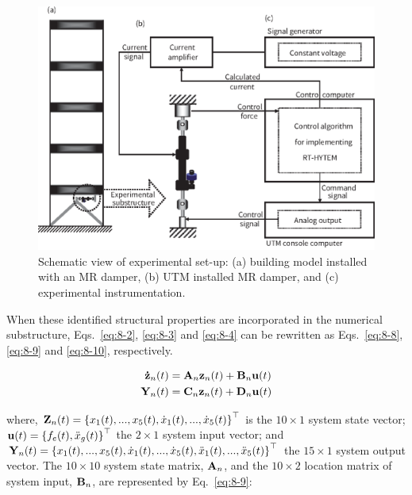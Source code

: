 \begin{figure}[ht]
\centering
\includegraphics[width=1\textwidth] {figure/8-3.eps}
\caption{Schematic view of experimental set-up: (a) building model installed with an MR damper, (b) UTM installed MR damper, and (c) experimental instrumentation.}
\label{fig:8-3}
\end{figure}


When these identified structural properties are incorporated in the numerical substructure, Eqs.~\eqref{eq:8-2}, \eqref{eq:8-3} and \eqref{eq:8-4} can be rewritten as Eqs.~\eqref{eq:8-8}, \eqref{eq:8-9} and \eqref{eq:8-10}, respectively.

\begin{equation}\label{eq:8-8}
\begin{aligned}
\mathbf{\dot{z}}_{n}(t) & = \mathbf{A}_{n}\mathbf{z}_{n}(t) + \mathbf{B}_{n}\mathbf{u}(t) \\
\mathbf{Y}_{n}(t) & = \mathbf{C}_{n}\mathbf{z}_{n}(t) + \mathbf{D}_{n}\mathbf{u}(t)
\end{aligned}
\end{equation}

where, $\mathbf{Z}_{n}(t) = \left\{ x_{1}(t),...,x_{5}(t),\dot{x}_{1}(t),...,\dot{x}_{5}(t)\right\}^{\top}$ is the $10\times1$ system state vector; $\mathbf{u}(t)=\left\{f_{e}(t), \ddot{x}_{g}(t)\right\}^{\top}$ the $2\times1$ system input vector; and $\mathbf{Y}_{n}(t) = \left\{x_{1}(t),...,x_{5}(t),\dot{x}_{1}(t),...,\dot{x}_{5}(t),\ddot{x}_{1}(t),...,\ddot{x}_{5}(t)\right\}^{\top}$ the $15\times1$ system output vector. The $10\times10$ system state matrix, $\mathbf{A}_{n}$, and the $10\times2$ location matrix of system input, $\mathbf{B}_{n}$, are represented by Eq.~\eqref{eq:8-9}:

